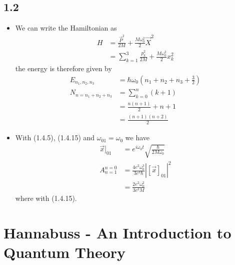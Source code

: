 \documentclass[10pt,a4paper]{book}
\theoremstyle{definition}
\begin{document}
\subsection{1.2}
\begin{itemize}
\item We can write the Hamiltonian as
\begin{align}
    H&=\frac{\vec{P}^2}{2M}+\frac{M\omega_0^2}{2}\vec{X}^2\\
    &=\sum_{k=1}^3\frac{p_k^2}{2M}+\frac{M\omega_0^2}{2}x_k^2
\end{align}
the energy is therefore given by
\begin{align}
    E_{n_1,n_2,n_3}&=\hbar\omega_0\left(n_1+n_2+n_3+\frac{3}{2}\right)\\
    N_{n=n_1+n_2+n_3}&=\sum_{k=0}^{n}(k+1)\\
    &=\frac{n(n+1)}{2}+n+1\\
    &=\frac{(n+1)(n+2)}{2}
\end{align}

\item With (1.4.5), (1.4.15) and $\omega_{01}=\omega_0$ we have
\begin{align}
    \vec{x}]_{01}&=e^{i\omega_0 t}\sqrt{\frac{\hbar}{2M\omega_0}}\\
    A_{n=1}^{n=0}&=\frac{4e^2\omega_0^3}{3c^3\hbar}\left|[\vec{x}]_{01}\right|^2\\
    &=\frac{2e^2\omega_0^2}{3c^3M}
\end{align}
where with (1.4.15).
\end{itemize}

\section{{\sc Hannabuss} - An Introduction to Quantum Theory}
\end{document}
